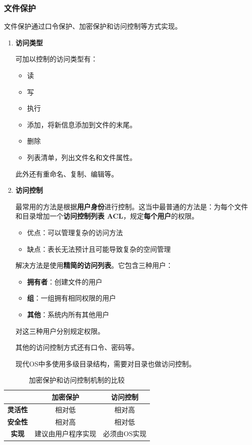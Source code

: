 \documentclass[12pt, a4paper, oneside]{ctexart}
\begin{document}
\subsubsection{文件保护}

文件保护通过口令保护、加密保护和访问控制等方式实现。

\begin{enumerate}
  \item {\bf 访问类型}
  
  可加以控制的访问类型有：
  \begin{itemize}
    \item 读
    \item 写
    \item 执行
    \item 添加，将新信息添加到文件的末尾。
    \item 删除
    \item 列表清单，列出文件名和文件属性。
  \end{itemize}

  此外还有重命名、复制、编辑等。

  \item {\bf 访问控制}
  
  最常用的方法是根据\textbf{用户身份}进行控制。这当中最普通的方法是：为每个文件和目录增加一个\textbf{访问控制列表 ACL}，规定\textbf{每个用户}的权限。
  \begin{itemize}
    \item 优点：可以管理复杂的访问方法
    \item 缺点：表长无法预计且可能导致复杂的空间管理
  \end{itemize}
  
  解决方法是使用\textbf{精简的访问列表}。它包含三种用户：
  \begin{itemize}
    \item {\bf 拥有者}：创建文件的用户
    \item {\bf 组}：一组拥有相同权限的用户
    \item {\bf 其他}：系统内所有其他用户
  \end{itemize}
  对这三种用户分别规定权限。

  其他的访问控制方式还有口令、密码等。

  现代OS中多使用多级目录结构，需要对目录也做访问控制。
\end{enumerate}

\begin{table}[h]
  \centering
  \caption{加密保护和访问控制机制的比较}
  \begin{tabular}{|c|c|c|}
    \hline
    & \textbf{加密保护} & \textbf{访问控制} \\ \hline
    \textbf{灵活性} & 相对低 & 相对高 \\ \hline
    \textbf{安全性} & 相对高 & 相对低 \\ \hline
    \textbf{实现} & 建议由用户程序实现 & 必须由OS实现 \\
    \hline
  \end{tabular}
\end{table}
\end{document}
